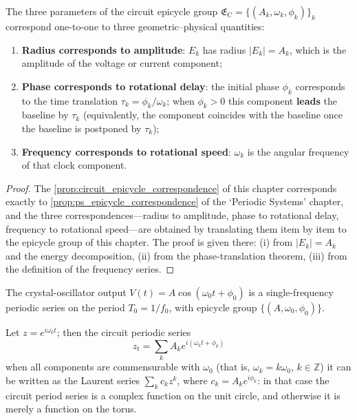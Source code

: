 \begin{proposition}\label{prop:circuit_epicycle_correspondence}
The three parameters of the circuit epicycle group $\mathfrak E_{\mathrm{C}}=\{(A_k,\omega_k,\phi_k)\}_{k}$ correspond one-to-one to three geometric--physical quantities:
\begin{enumerate}[label=(\roman*)]
    \item \textbf{Radius corresponds to amplitude}: $E_k$ has radius $|E_k|=A_k$, which is the amplitude of the voltage or current component;
    \item \textbf{Phase corresponds to rotational delay}: the initial phase $\phi_k$ corresponds to the time translation $\tau_k=\phi_k/\omega_k$; when $\phi_k>0$ this component \textbf{leads} the baseline by $\tau_k$ (equivalently, the component coincides with the baseline once the baseline is postponed by $\tau_k$);
    \item \textbf{Frequency corresponds to rotational speed}: $\omega_k$ is the angular frequency of that clock component.
\end{enumerate}
\end{proposition}

\begin{proof}
The \cref{prop:circuit_epicycle_correspondence} of this chapter corresponds exactly to \cref{prop:ps_epicycle_correspondence} of the `Periodic Systems' chapter,
and the three correspondences---radius to amplitude, phase to rotational delay, frequency to rotational speed---are obtained by translating them item by item to the epicycle group of this chapter.
The proof is given there: (i) from $|E_k|=A_k$ and the energy decomposition, (ii) from the phase-translation theorem, (iii) from the definition of the frequency series.
\end{proof}

\begin{example}\label{ex:circuit_quartz_series}
The crystal-oscillator output $V(t)=A\cos(\omega_0t+\phi_0)$ is a single-frequency periodic series on the period $T_0=1/f_0$, with epicycle group $\{(A,\omega_0,\phi_0)\}$.
\end{example}

\begin{remark}\label{rem:circuit_series_complex}
Let $z=e^{i\omega_0t}$; then the circuit periodic series
\[
z_t=\sum_k A_k e^{i(\omega_k t+\phi_k)}
\]
when all components are commensurable with $\omega_0$ (that is, $\omega_k=k\omega_0$, $k\in\mathbb Z$) it can be written as the Laurent series $\sum_k c_k z^k$, where $c_k=A_k e^{i\phi_k}$: in that case the circuit period series is a complex function on the unit circle, and otherwise it is merely a function on the torus.
\end{remark}

